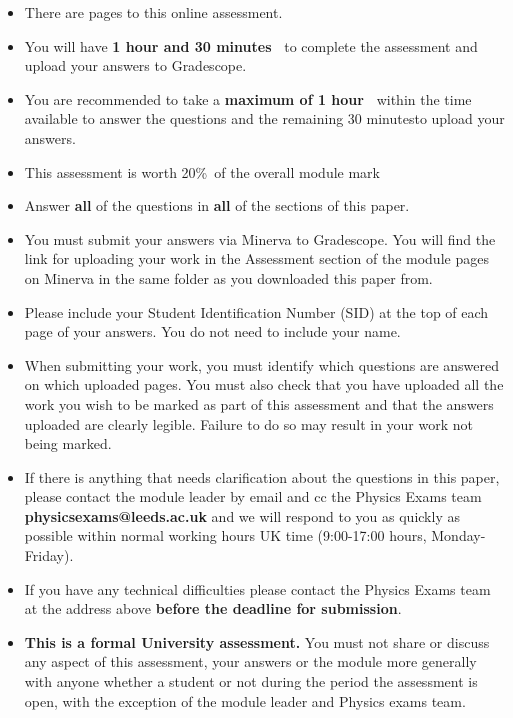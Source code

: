 \documentclass[12pt]{article}
\def\totaltime{1 hour and 30 minutes\ } %
\def\answertime{1 hour\ } %
\def\uploadtime{30 minutes}%
\def\paperweight{20\%\ }
\begin{document}
\begin{itemize}[itemsep=0pt,topsep=0pt]
\item There are \pageref{LastPage} pages to this online assessment.
\item You will have \textbf{\totaltime} to complete the assessment and upload your answers to Gradescope.
\item You are recommended to take a \textbf{maximum of \answertime} within the time available to answer the questions and the remaining \uploadtime to upload your answers. 
\item This assessment is worth \paperweight of the overall module mark
\item Answer \textbf{all} of the questions in \textbf{all} of the sections of this paper.
\item You must submit your answers via Minerva to Gradescope. You will find the link for uploading your work in the Assessment section of the module pages on Minerva in the same folder as you downloaded this paper from.
\item Please include your Student Identification Number (SID) at the top of each page of your answers. You do not need to include your name.
\item When submitting your work, you must identify which questions are answered on which uploaded pages. You must also check that you have uploaded all the work you wish to be marked as part of this assessment and that the answers uploaded are clearly legible. Failure to do so may result in your work not being marked.
\item If there is anything that needs clarification about the questions in this paper, please contact the module leader by email and cc the Physics Exams team \textbf{physicsexams@leeds.ac.uk} and we will respond to you as quickly as possible within normal working hours UK time (9:00-17:00 hours, Monday-Friday). 
\item If you have any technical difficulties please contact the Physics Exams team at the address above \textbf{before the deadline for submission}.
\item \textbf{This is a formal University assessment.} You must not share or discuss any aspect of this assessment, your answers or the module more generally with anyone whether a student or not during the period the assessment is open, with the exception of the module leader and Physics exams team.
\end{itemize}	
	
\end{document}
